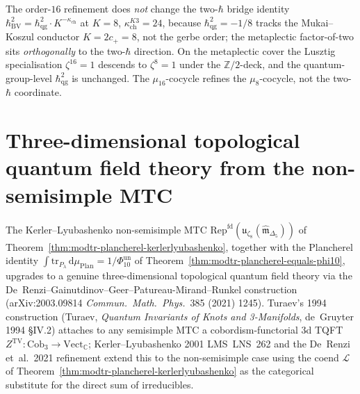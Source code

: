 \begin{remark}
\label{rem:modtr-mu16-two-hbar}
The order-$16$ refinement does \emph{not} change the two-$\hbar$
bridge identity $\hbar_{\mathrm{BV}}^2 = \hbar_{\mathrm{qg}}^2\cdot K^{-\kappa_{\mathrm{ch}}}$
at $K = 8$, $\kappa_{\mathrm{ch}}^{K3} = 24$, because
$\hbar_{\mathrm{qg}}^2 = -1/8$ tracks the Mukai--Koszul conductor
$K = 2c_+ = 8$, not the gerbe order; the metaplectic factor-of-two
sits \emph{orthogonally} to the two-$\hbar$ direction. On the
metaplectic cover the Lusztig specialisation
$\zeta^{16} = 1$ descends to $\zeta^8 = 1$ under the $\mathbb Z/2$-deck,
and the quantum-group-level $\hbar_{\mathrm{qg}}^2$ is unchanged. The
$\mu_{16}$-cocycle refines the $\mu_8$-cocycle, not the two-$\hbar$
coordinate.
\end{remark}

\section{Three-dimensional topological quantum field theory from the non-semisimple MTC}
\label{sec:modtr-3d-tqft-state-spaces}

The Kerler--Lyubashenko non-semisimple MTC
$\mathrm{Rep}^{\mathrm{fd}}(\mathfrak u_{\zeta_8}
(\widehat{\mathfrak m}_{\Delta_5}))$ of
Theorem~\ref{thm:modtr-plancherel-kerlerlyubashenko}, together
with the Plancherel identity
$\int\mathrm{tr}_{P_\lambda}\,\mathrm d\mu_{\mathrm{Plan}}
= 1/\Phi_{10}^{\mathrm{un}}$ of
Theorem~\ref{thm:modtr-plancherel-equals-phi10}, upgrades to a
genuine three-dimensional topological quantum field theory via the
De~Renzi--Gainutdinov--Geer--Patureau-Mirand--Runkel construction
(arXiv:2003.09814 \emph{Commun.\ Math.\ Phys.}~385 (2021) 1245).
Turaev's 1994 construction
(Turaev, \emph{Quantum Invariants of Knots and 3-Manifolds},
de~Gruyter 1994 \S IV.2) attaches to any semisimple MTC a
cobordism-functorial 3d TQFT
$Z^{\mathrm{TV}}\colon\mathrm{Cob}_3\to\mathrm{Vect}_{\mathbb C}$;
Kerler--Lyubashenko 2001 LMS~LNS~262 and the De~Renzi et~al.\ 2021
refinement extend this to the non-semisimple case using the coend
$\mathcal L$ of
Theorem~\ref{thm:modtr-plancherel-kerlerlyubashenko} as the
categorical substitute for the direct sum of irreducibles.

